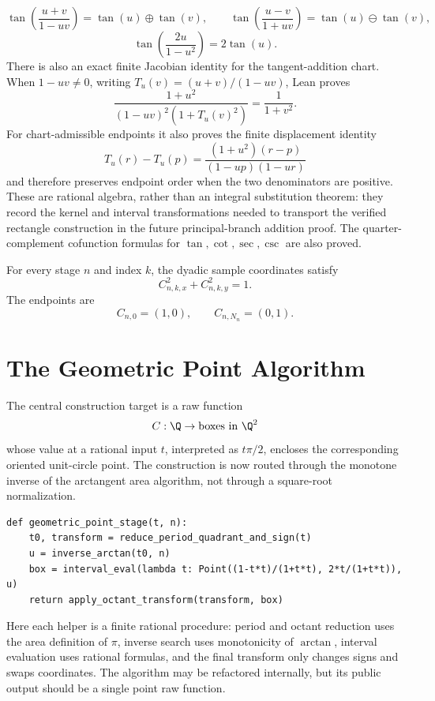 \begin{theorem}
\[
  \tan\!\left(\frac{u+v}{1-uv}\right)=\tan(u)\oplus\tan(v),\qquad
  \tan\!\left(\frac{u-v}{1+uv}\right)=\tan(u)\ominus\tan(v),
\]
\[
  \tan\!\left(\frac{2u}{1-u^2}\right)=2\tan(u).
\]
There is also an exact finite Jacobian identity for the tangent-addition
chart.  When \(1-uv\ne0\), writing
\(T_u(v)=(u+v)/(1-uv)\), Lean proves
\[
  \frac{1+u^2}{(1-uv)^2(1+T_u(v)^2)}=\frac{1}{1+v^2}.
\]
For chart-admissible endpoints it also proves the finite displacement identity
\[
 T_u(r)-T_u(p)=
 \frac{(1+u^2)(r-p)}{(1-up)(1-ur)}
\]
and therefore preserves endpoint order when the two denominators are positive.
These are rational algebra, rather than an integral substitution theorem: they
record the kernel and interval transformations needed to transport the
verified rectangle construction in the future principal-branch addition proof.
The quarter-complement cofunction formulas for \(\tan,\cot,\sec,\csc\) are
also proved.
\end{theorem}

\begin{theorem}
\label{thm:dyadic-trig-samples}
\leanok
For every stage \(n\) and index \(k\), the dyadic sample coordinates satisfy
\[
  C_{n,k,x}^2+C_{n,k,y}^2=1.
\]
The endpoints are
\[
  C_{n,0}=(1,0),
  \qquad
  C_{n,N_n}=(0,1).
\]
\end{theorem}

\section{The Geometric Point Algorithm}

\begin{definition}
\label{def:geometric-point-functionraw}
The central construction target is a raw function
\[
  C : \Q \to \hbox{boxes in }\Q^2
\]
whose value at a rational input \(t\), interpreted as \(t\pi/2\), encloses the
corresponding oriented unit-circle point.  The construction is now routed
through the monotone inverse of the arctangent area algorithm, not through a
square-root normalization.
\begin{verbatim}
def geometric_point_stage(t, n):
    t0, transform = reduce_period_quadrant_and_sign(t)
    u = inverse_arctan(t0, n)
    box = interval_eval(lambda t: Point((1-t*t)/(1+t*t), 2*t/(1+t*t)), u)
    return apply_octant_transform(transform, box)
\end{verbatim}
Here each helper is a finite rational procedure: period and octant reduction
uses the area definition of \(\pi\), inverse search uses monotonicity of
\(\arctan\), interval evaluation uses rational formulas, and the final
transform only changes signs and swaps coordinates.  The algorithm may be
refactored internally, but its public output should be a single point raw
function.
\end{definition}


